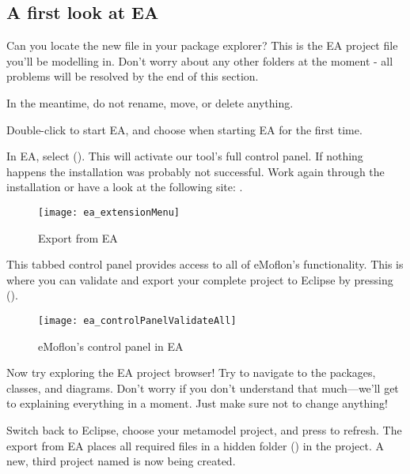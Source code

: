 \clearpage
\genHeader

\subsection{A first look at EA}

\begin{stepbystep}
\FloatBarrier
\hypertarget{simpleDemo vis}{}
\item Can you locate the new  file in your package explorer? This is the EA project file you'll be
modelling in. Don't worry about any other folders at the moment - all problems will be resolved by the end of this section.

In the meantime, do not rename, move, or delete anything.

\item Double-click  to start EA, and choose  when starting EA for the first time.

\item In EA, select  ().
This will activate our tool's full control panel.
If nothing happens the installation was probably not successful. 
Work again through the installation or have a look at the following site:
\newline
{}.
%
\begin{figure}[htbp]
	\centering
  \texttt{[image: ea\_extensionMenu]}
	\caption{Export from EA} 
	\label{ea:validate_dropdown} 
\end{figure}
%
\item
This tabbed control panel provides access to all of eMoflon's functionality.
This is where you can validate and export your complete project to Eclipse by pressing  ().
%
\begin{figure}[htbp]
	\centering
  \texttt{[image: ea\_controlPanelValidateAll]}
	\caption{eMoflon's control panel in EA} 
	\label{ea:controlPanel} 
\end{figure}
%
\item
Now try exploring the EA project browser!
Try to navigate to the packages, classes, and diagrams.
Don't worry if you don't understand that much---we'll get to explaining everything in a moment.
Just make sure not to change anything!

\item Switch back to Eclipse, choose your metamodel project, and press  to refresh. 
The export from EA places all required files in a hidden folder () in the project.
A new, third project named  is now being created.


\end{stepbystep}
